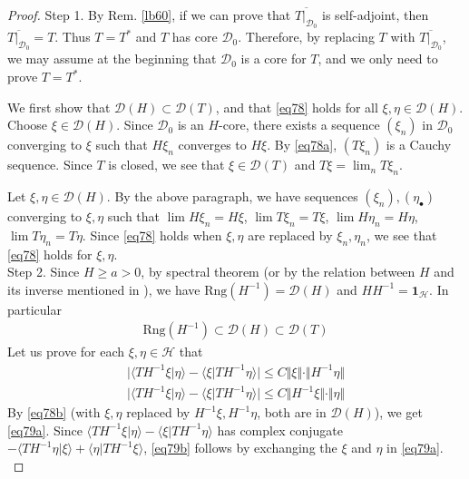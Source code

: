 \documentclass[12pt,b5paper,notitlepage]{article}
\theoremstyle{definition}
\theoremstyle{plain}
\newcommand{\mc}{\mathcal}
\newcommand{\ovl}{\overline}
\newcommand{\idt}{\mathbf{1}}
\newcommand{\Dom}{\scr{D}}
\newcommand{\bk}[1]{\langle {#1}\rangle}
\newcommand{\scr}{\mathscr}
\newcommand{\blt}{\bullet}
\newcommand{\Rng}{\mathrm{Rng}}
\numberwithin{equation}{section}
\begin{document}
\begin{proof}
Step 1. By Rem. \ref{lb60}, if we can prove that $\ovl{T|_{\Dom_0}}$ is self-adjoint, then $\ovl{T|_{\Dom_0}}=T$. Thus $T=T^*$ and $T$ has core $\Dom_0$. Therefore, by replacing $T$ with $\ovl{T|_{\Dom_0}}$, we may assume at the beginning that $\Dom_0$ is a core for $T$, and we only need to prove $T=T^*$. 

We first show that $\Dom(H)\subset\Dom(T)$, and that \eqref{eq78} holds for all $\xi,\eta\in\Dom(H)$. Choose $\xi\in\Dom(H)$. Since $\Dom_0$ is an $H$-core, there exists a sequence $(\xi_n)$ in $\Dom_0$ converging to $\xi$ such that $H\xi_n$  converges to $H\xi$. By \eqref{eq78a}, $(T\xi_n)$ is a Cauchy sequence. Since $T$ is closed, we see that $\xi\in \Dom(T)$ and $T\xi=\lim_n T\xi_n$. 

Let $\xi,\eta\in\Dom(H)$. By the above paragraph, we have sequences $(\xi_n),(\eta_\blt)$ converging to $\xi,\eta$ such that $\lim H\xi_n=H\xi$, $\lim T\xi_n=T\xi$, $\lim H\eta_n=H\eta$, $\lim T\eta_n=T\eta$. Since \eqref{eq78} holds when $\xi,\eta$ are replaced by $\xi_n,\eta_n$,  we see that \eqref{eq78} holds for $\xi,\eta$.\\[-1ex] 

Step 2. Since $H\geq a>0$, by spectral theorem (or by the relation between $H$ and its inverse mentioned in \cite[Sec. 4]{Gui-S}), we have $\Rng(H^{-1})=\Dom(H)$ and $HH^{-1}=\idt_{\mc H}$. In particular
\begin{align*}
\Rng(H^{-1})\subset\Dom(H)\subset\Dom(T)
\end{align*}
Let us prove for each $\xi,\eta\in\mc H$ that
\begin{subequations}\label{eq79}
\begin{gather}
\big|\bk{TH^{-1}\xi|\eta}-\bk{\xi|TH^{-1}\eta} \big|\leq C\Vert\xi\Vert\cdot \Vert H^{-1}\eta\Vert\label{eq79a}\\
\big|\bk{TH^{-1}\xi|\eta}-\bk{\xi|TH^{-1}\eta} \big|\leq C\Vert H^{-1}\xi\Vert\cdot \Vert \eta\Vert\label{eq79b}
\end{gather}
\end{subequations}
By \eqref{eq78b} (with $\xi,\eta$ replaced by $H^{-1}\xi,H^{-1}\eta$, both are in $\Dom(H)$), we get \eqref{eq79a}. Since $\bk{TH^{-1}\xi|\eta}-\bk{\xi|TH^{-1}\eta}$ has complex conjugate $-\bk{TH^{-1}\eta|\xi}+\bk{\eta|TH^{-1}\xi}$, \eqref{eq79b} follows by exchanging the $\xi$ and $\eta$ in \eqref{eq79a}.\\[-1ex]


\end{proof}
\end{document}
